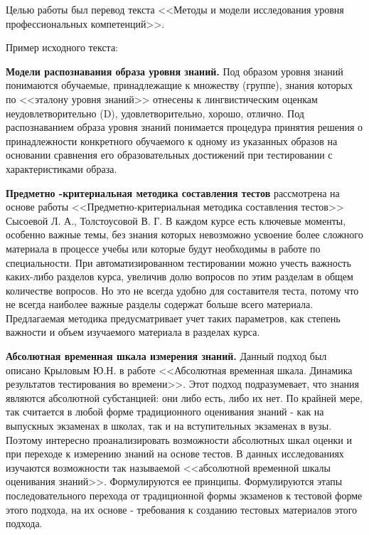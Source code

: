 Целью работы был перевод текста <<Методы и модели исследования уровня
профессиональных компетенций>>. 

Пример исходного текста:

\vspace{1.5em}

\small
\textbf{Модели распознавания образа уровня знаний.} Под образом уровня знаний понимаются обучаемые, принадлежащие к множеству (группе), знания которых по <<эталону уровня знаний>> отнесены к лингвистическим оценкам неудовлетворительно (D), удовлетворительно, хорошо, отлично. Под распознаванием образа уровня знаний понимается процедура принятия решения о принадлежности конкретного обучаемого к одному из указанных образов на основании сравнения его образовательных достижений при тестировании с характеристиками образа.

\textbf{Предметно -критериальная методика составления тестов} рассмотрена на основе работы <<Предметно-критериальная методика составления тестов>> Сысоевой Л. А., Толстоусовой В. Г. В каждом курсе есть ключевые моменты, особенно важные темы, без знания которых невозможно усвоение более сложного материала в процессе учебы или которые будут необходимы в работе по специальности. При автоматизированном тестировании можно учесть важность каких-либо разделов курса, увеличив долю вопросов по этим разделам в общем количестве вопросов. Но это не всегда удобно для составителя теста, потому что не всегда наиболее важные разделы содержат больше всего материала. Предлагаемая методика предусматривает учет таких параметров, как степень важности и объем изучаемого материала в разделах курса.

\textbf{Абсолютная временная шкала измерения знаний.} Данный подход был описано Крыловым Ю.Н. в работе <<Абсолютная временная шкала. Динамика результатов тестирования во времени>>. Этот подход подразумевает, что знания являются абсолютной субстанцией: они либо есть, либо их нет. По крайней мере, так считается в любой форме традиционного оценивания знаний - как на выпускных экзаменах в школах, так и на вступительных экзаменах в вузы. Поэтому интересно проанализировать возможности абсолютных шкал оценки и при переходе к измерению знаний на основе тестов. В данных исследованиях изучаются возможности так называемой <<абсолютной временной шкалы оценивания знаний>>. Формулируются ее принципы. Формулируются этапы последовательного перехода от традиционной формы экзаменов к тестовой форме этого подхода, на их основе - требования к созданию тестовых материалов этого подхода.

